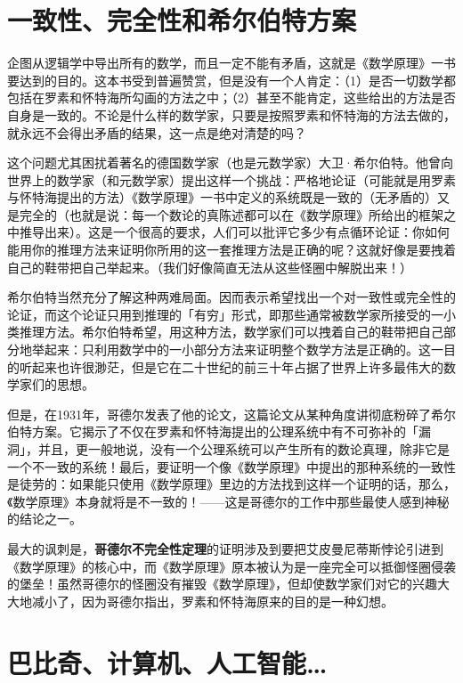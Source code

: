 \documentclass[
  12pt,
  twoside,
  openright,
  oldfontcommands,
]{memoir}
\newcommand{\heititext}[1]{{\heifamily\bfseries #1}}
\begin{document}
\section{一致性、完全性和希尔伯特方案}

企图从逻辑学中导出所有的数学，而且一定不能有矛盾，这就是《数学原理》一书要达到的目的。这本书受到普遍赞赏，但是没有一个人肯定：（1）是否一切数学都包括在罗素和怀特海所勾画的方法之中；（2）甚至不能肯定，这些给出的方法是否自身是一致的。不论是什么样的数学家，只要是按照罗素和怀特海的方法去做的，就永远不会得出矛盾的结果，这一点是绝对清楚的吗？

这个问题尤其困扰着著名的德国数学家（也是元数学家）大卫·希尔伯特。他曾向世界上的数学家（和元数学家）提出这样一个挑战：严格地论证（可能就是用罗素与怀特海提出的方法）《数学原理》一书中定义的系统既是一致的（无矛盾的）又是完全的（也就是说：每一个数论的真陈述都可以在《数学原理》所给出的框架之中推导出来）。这是一个很高的要求，人们可以批评它多少有点循环论证：你如何能用你的推理方法来证明你所用的这一套推理方法是正确的呢？这就好像是要拽着自己的鞋带把自己举起来。（我们好像简直无法从这些怪圈中解脱出来！）

希尔伯特当然充分了解这种两难局面。因而表示希望找出一个对一致性或完全性的论证，而这个论证只用到推理的「有穷」形式，即那些通常被数学家所接受的一小类推理方法。希尔伯特希望，用这种方法，数学家们可以拽着自己的鞋带把自己部分地举起来：只利用数学中的一小部分方法来证明整个数学方法是正确的。这一目的听起来也许很渺茫，但是它在二十世纪的前三十年占据了世界上许多最伟大的数学家们的思想。

但是，在1931年，哥德尔发表了他的论文，这篇论文从某种角度讲彻底粉碎了希尔伯特方案。它揭示了不仅在罗素和怀特海提出的公理系统中有不可弥补的「漏洞」，并且，更一般地说，没有一个公理系统可以产生所有的数论真理，除非它是一个不一致的系统！最后，要证明一个像《数学原理》中提出的那种系统的一致性是徒劳的：如果能只使用《数学原理》里边的方法找到这样一个证明的话，那么，《数学原理》本身就将是不一致的！------这是哥德尔的工作中那些最使人感到神秘的结论之一。

最大的讽刺是，\heititext{哥德尔不完全性定理}的证明涉及到要把艾皮曼尼蒂斯悖论引进到《数学原理》的核心中，而《数学原理》原本被认为是一座完全可以抵御怪圈侵袭的堡垒！虽然哥德尔的怪圈没有摧毁《数学原理》，但却使数学家们对它的兴趣大大地减小了，因为哥德尔指出，罗素和怀特海原来的目的是一种幻想。

\section{巴比奇、计算机、人工智能\ldots{}}
\end{document}
